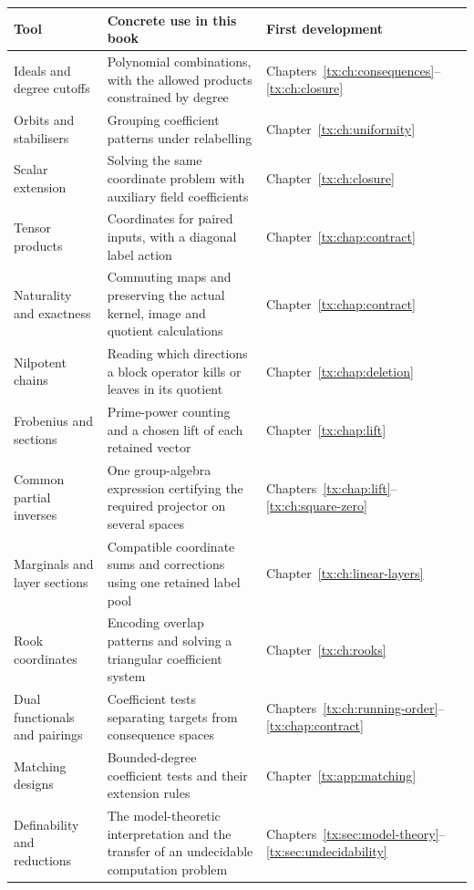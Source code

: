 \documentclass[11pt,a4paper,oneside,openany]{book}
\theoremstyle{definition}\newtheorem{definition}[theorem]{Definition}
\theoremstyle{remark}\newtheorem{remark}[theorem]{Remark}
\numberwithin{equation}{chapter}
\begin{document}
\begin{longtable}{@{}p{.23\linewidth}p{.47\linewidth}p{.22\linewidth}@{}}
\toprule
Tool & Concrete use in this book & First development\\
\midrule
Ideals and degree cutoffs & Polynomial combinations, with the
allowed products constrained by degree & Chapters~\ref{tx:ch:consequences}--\ref{tx:ch:closure}\\
Orbits and stabilisers & Grouping coefficient patterns under relabelling
& Chapter~\ref{tx:ch:uniformity}\\
Scalar extension & Solving the same coordinate problem with auxiliary
field coefficients & Chapter~\ref{tx:ch:closure}\\
Tensor products & Coordinates for paired inputs, with a diagonal
label action & Chapter~\ref{tx:chap:contract}\\
Naturality and exactness & Commuting maps and preserving the actual
kernel, image and quotient calculations & Chapter~\ref{tx:chap:contract}\\
Nilpotent chains & Reading which directions a block operator kills
or leaves in its quotient & Chapter~\ref{tx:chap:deletion}\\
Frobenius and sections & Prime-power counting and a chosen lift of
each retained vector & Chapter~\ref{tx:chap:lift}\\
Common partial inverses & One group-algebra expression certifying
the required projector on several spaces & Chapters~\ref{tx:chap:lift}--\ref{tx:ch:square-zero}\\
Marginals and layer sections & Compatible coordinate sums and
corrections using one retained label pool & Chapter~\ref{tx:ch:linear-layers}\\
Rook coordinates & Encoding overlap patterns and solving a
triangular coefficient system & Chapter~\ref{tx:ch:rooks}\\
Dual functionals and pairings & Coefficient tests separating targets
from consequence spaces & Chapters~\ref{tx:ch:running-order}--\ref{tx:chap:contract}\\
Matching designs & Bounded-degree coefficient tests and their
extension rules & Chapter~\ref{tx:app:matching}\\
Definability and reductions & The model-theoretic interpretation and
the transfer of an undecidable computation problem & Chapters~\ref{tx:sec:model-theory}--\ref{tx:sec:undecidability}\\
\bottomrule
\end{longtable}
\end{document}
